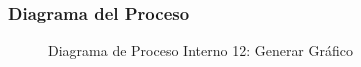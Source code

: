 \subsubsection{Diagrama del Proceso}
\begin{figure}[H]
    \centering
    \caption{Diagrama de Proceso Interno 12: Generar Gráfico}%
    \label{fig:process_diagram12}
\end{figure}
\newpage